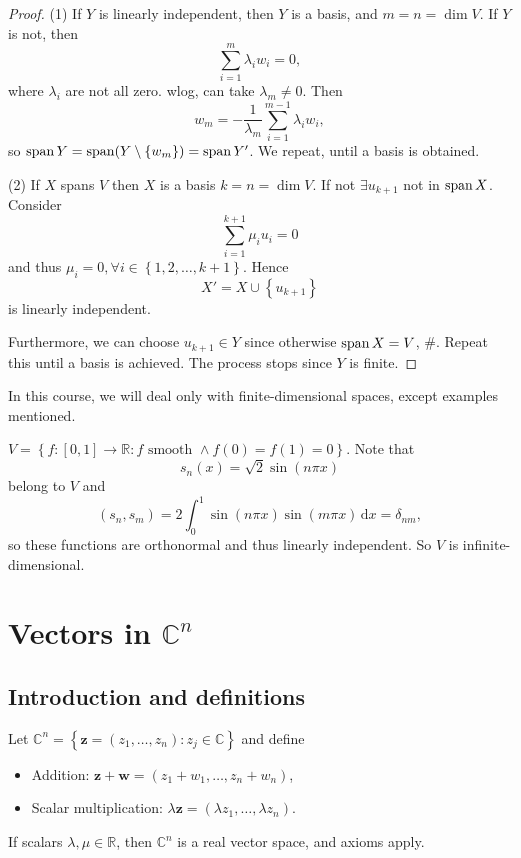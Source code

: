 \documentclass[10pt]{article}
\begin{document}
    \begin{proof}
        (1) If $Y$ is linearly independent, then $Y$ is a basis, and $m=n=\dim V$. If $Y$ is not, then 
        \[
            \sum_{i=1}^{m}\lambda_i w_i=0
        ,\]
        where $ \lambda_i $ are not all zero. wlog, can take $\lambda_m\neq 0.$ Then 
        \[
            w_m=-\frac{1}{\lambda_m}\sum_{i=1}^{m-1}\lambda_i w_i
        ,\]
        so $ \operatorname{span} Y=\operatorname{span} (Y\setminus \left\{ w_m\right\})=\operatorname{span} Y' $. We repeat, until a basis is obtained.

        (2) If $X$ spans $V$ then $X$ is a basis $k=n=\dim V$. If not $ \exists u_{k+1} $ not in $\operatorname{span} X$. Consider 
        \[
            \sum_{i=1}^{k+1}\mu_i u_i=0
        \]
        and thus $\mu_{i}=0, \forall i\in \left\{ 1,2,\dots,k+1\right\}$. Hence 
        \[
            X'=X \cup \left\{ u_{k+1}\right\}
        \]
        is linearly independent.

        Furthermore, we can choose $u_{k+1}\in Y$ since otherwise $ \operatorname{span} X=V $, \#. Repeat this until a basis is achieved. The process stops since $Y$ is finite.
    \end{proof}
    In this course, we will deal only with finite-dimensional spaces, except examples mentioned.
    \begin{example}
        $ V=\left\{ f:[0,1] \to \mathbb{R} : f\text{ smooth } \land f(0)=f(1)=0\right\} $. Note that 
        \[s_n(x)=\sqrt{2}\sin(n\pi x)\]
        belong to $V$ and 
        \[
            (s_n,s_m)=2 \int_{0}^{1} \sin(n\pi x)\sin(m\pi x) \,\mathrm{d}x=\delta_{nm},
        \]
        so these functions are orthonormal and thus linearly independent. So $V$ is infinite-dimensional.
    \end{example}
    \section{Vectors in $\mathbb{C}^n$}
    \subsection{Introduction and definitions}
    Let $ \mathbb{C}^n=\left\{ \mathbf{z}=(z_1,\dots,z_n):z_j\in \mathbb{C}\right\} $ and define 
    \begin{itemize}
        \item Addition: $ \mathbf{z}+\mathbf{w}=(z_1+w_1,\dots,z_n+w_n) $,
        \item Scalar multiplication: $ \lambda \mathbf{z}=(\lambda z_1,\dots, \lambda z_n) $.
    \end{itemize}
    If scalars $ \lambda,\mu\in \mathbb{R} $, then $ \mathbb{C}^n $ is a real vector space, and axioms apply.
\end{document}
